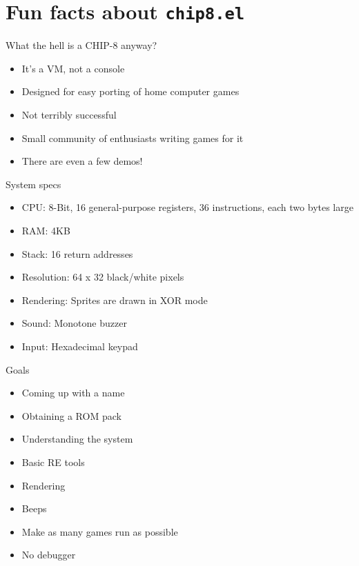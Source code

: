 \documentclass[presentation]{beamer}
\begin{document}
\section{Fun facts about \texttt{chip8.el}}
\label{sec:orgb7bf18e}

\begin{frame}[label={sec:org19e92bd}]{What the hell is a CHIP-8 anyway?}
\begin{itemize}
\item It's a VM, not a console
\item Designed for easy porting of home computer games
\item Not terribly successful
\item Small community of enthusiasts writing games for it
\item There are even a few demos!
\end{itemize}
\end{frame}

\begin{frame}[label={sec:orgf2c8914}]{System specs}
\begin{itemize}
\item CPU: 8-Bit, 16 general-purpose registers, 36 instructions, each two
bytes large
\item RAM: 4KB
\item Stack: 16 return addresses
\item Resolution: 64 x 32 black/white pixels
\item Rendering: Sprites are drawn in XOR mode
\item Sound: Monotone buzzer
\item Input: Hexadecimal keypad
\end{itemize}
\end{frame}

\begin{frame}[label={sec:org0bcc3e8}]{Goals}
\begin{itemize}
\item Coming up with a name
\item Obtaining a ROM pack
\item Understanding the system
\item Basic RE tools
\item Rendering
\item Beeps
\item Make as many games run as possible
\item No debugger
\end{itemize}
\end{frame}
\end{document}
